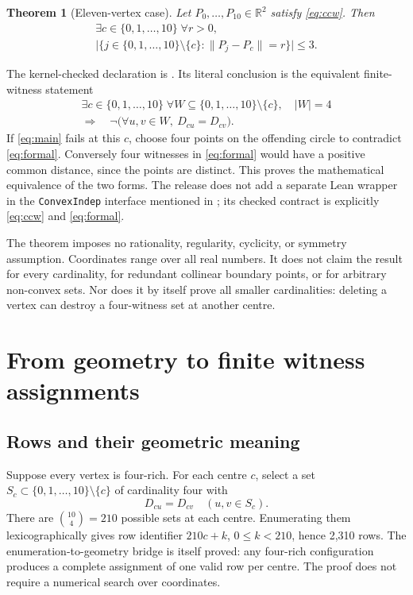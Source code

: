 \documentclass[11pt,a4paper]{article}
\newtheorem{theorem}{Theorem}[section]
\theoremstyle{definition}
\newcommand{\R}{\mathbb R}
\newcommand{\I}{\{0,1,\ldots,10\}}
\newcommand{\code}[1]{\texttt{#1}}
\begin{document}
\begin{theorem}[Eleven-vertex case]\label{thm:main}
Let $P_0,\ldots,P_{10}\in\R^2$ satisfy \eqref{eq:ccw}. Then
\begin{equation}\label{eq:main}
 \begin{gathered}\exists c\in\I\;\forall r>0,\qquad\\
 \bigl|\{j\in\I\setminus\{c\}:\|P_j-P_c\|=r\}\bigr|\le3.\end{gathered}
\end{equation}
\end{theorem}
The kernel-checked declaration is . Its literal conclusion is the equivalent finite-witness statement
\begin{equation}\label{eq:formal}
 \begin{gathered}\exists c\in\I\;\forall W\subseteq\I\setminus\{c\},\quad |W|=4\\
 \Longrightarrow\quad \neg\bigl(\forall u,v\in W,\ D_{cu}=D_{cv}\bigr).\end{gathered}
\end{equation}
If \eqref{eq:main} fails at this $c$, choose four points on the offending circle to contradict \eqref{eq:formal}. Conversely four witnesses in \eqref{eq:formal} would have a positive common distance, since the points are distinct. This proves the mathematical equivalence of the two forms. The release does not add a separate Lean wrapper in the \code{ConvexIndep} interface mentioned in ; its checked contract is explicitly \eqref{eq:ccw} and \eqref{eq:formal}.

The theorem imposes no rationality, regularity, cyclicity, or symmetry assumption. Coordinates range over all real numbers. It does not claim the result for every cardinality, for redundant collinear boundary points, or for arbitrary non-convex sets. Nor does it by itself prove all smaller cardinalities: deleting a vertex can destroy a four-witness set at another centre.

\section{From geometry to finite witness assignments}\label{sec:geometry}
\subsection{Rows and their geometric meaning}
Suppose every vertex is four-rich. For each centre $c$, select a set $S_c\subset\I\setminus\{c\}$ of cardinality four with
\begin{equation}\label{eq:row}
 D_{cu}=D_{cv}\quad(u,v\in S_c).
\end{equation}
There are $\binom{10}{4}=210$ possible sets at each centre. Enumerating them lexicographically gives row identifier $210c+k$, $0\le k<210$, hence 2,310 rows. The enumeration-to-geometry bridge is itself proved: any four-rich configuration produces a complete assignment of one valid row per centre. The proof does not require a numerical search over coordinates.
\end{document}
